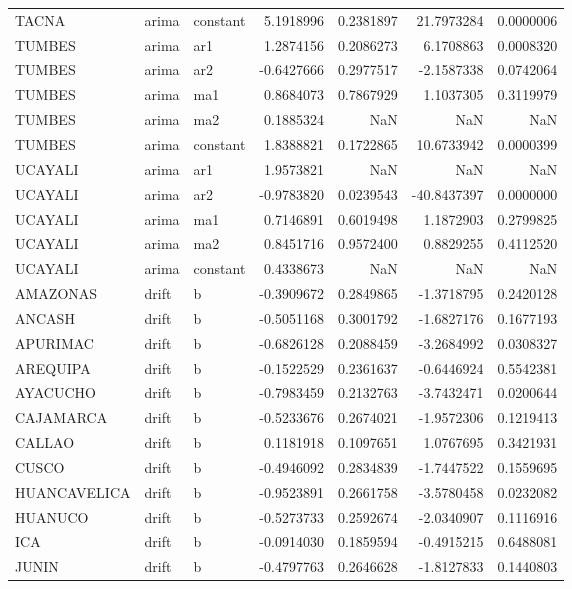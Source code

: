 \documentclass[
]{article}
\begin{document}
\begin{table}[!h]
\begin{tabular}[t]{lllrrrr}
TACNA & arima & constant & 5.1918996 & 0.2381897 & 21.7973284 & 0.0000006\\
TUMBES & arima & ar1 & 1.2874156 & 0.2086273 & 6.1708863 & 0.0008320\\
\addlinespace
TUMBES & arima & ar2 & -0.6427666 & 0.2977517 & -2.1587338 & 0.0742064\\
TUMBES & arima & ma1 & 0.8684073 & 0.7867929 & 1.1037305 & 0.3119979\\
TUMBES & arima & ma2 & 0.1885324 & NaN & NaN & NaN\\
TUMBES & arima & constant & 1.8388821 & 0.1722865 & 10.6733942 & 0.0000399\\
UCAYALI & arima & ar1 & 1.9573821 & NaN & NaN & NaN\\
\addlinespace
UCAYALI & arima & ar2 & -0.9783820 & 0.0239543 & -40.8437397 & 0.0000000\\
UCAYALI & arima & ma1 & 0.7146891 & 0.6019498 & 1.1872903 & 0.2799825\\
UCAYALI & arima & ma2 & 0.8451716 & 0.9572400 & 0.8829255 & 0.4112520\\
UCAYALI & arima & constant & 0.4338673 & NaN & NaN & NaN\\
AMAZONAS & drift & b & -0.3909672 & 0.2849865 & -1.3718795 & 0.2420128\\
\addlinespace
ANCASH & drift & b & -0.5051168 & 0.3001792 & -1.6827176 & 0.1677193\\
APURIMAC & drift & b & -0.6826128 & 0.2088459 & -3.2684992 & 0.0308327\\
AREQUIPA & drift & b & -0.1522529 & 0.2361637 & -0.6446924 & 0.5542381\\
AYACUCHO & drift & b & -0.7983459 & 0.2132763 & -3.7432471 & 0.0200644\\
CAJAMARCA & drift & b & -0.5233676 & 0.2674021 & -1.9572306 & 0.1219413\\
\addlinespace
CALLAO & drift & b & 0.1181918 & 0.1097651 & 1.0767695 & 0.3421931\\
CUSCO & drift & b & -0.4946092 & 0.2834839 & -1.7447522 & 0.1559695\\
HUANCAVELICA & drift & b & -0.9523891 & 0.2661758 & -3.5780458 & 0.0232082\\
HUANUCO & drift & b & -0.5273733 & 0.2592674 & -2.0340907 & 0.1116916\\
ICA & drift & b & -0.0914030 & 0.1859594 & -0.4915215 & 0.6488081\\
\addlinespace
JUNIN & drift & b & -0.4797763 & 0.2646628 & -1.8127833 & 0.1440803\\

\end{tabular}
\end{table}
\end{document}
